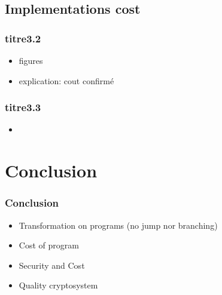 \documentclass{beamer}
\begin{document}
\subsection{Implementations cost}

\begin{frame} \frametitle{titre3.2}
  \begin{itemize}
  \item figures
  \item explication: cout confirmé
  \end{itemize}
\end{frame}

\begin{frame} \frametitle{titre3.3}
  \begin{itemize}
  \item {}
  \end{itemize}
\end{frame}

\section[Conclusion]{Conclusion}

\begin{frame}
  \frametitle{Conclusion}
  \begin{itemize}
  \item Transformation on programs (no jump nor branching)

  \item Cost of program

  \item Security and Cost

  \item Quality cryptosystem
  \end{itemize}
\end{frame}
\end{document}

